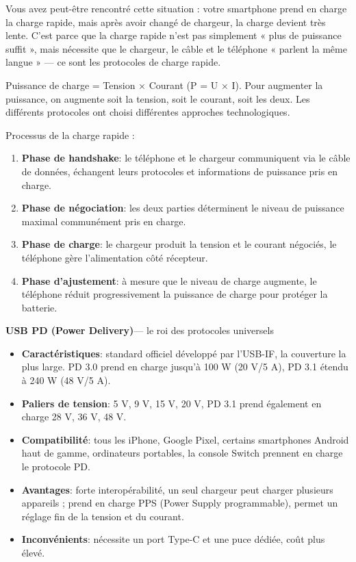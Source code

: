 
Vous avez peut-être rencontré cette situation : votre smartphone prend en charge la charge rapide, mais après avoir changé de chargeur, la charge devient très lente. C'est parce que la charge rapide n'est pas simplement « plus de puissance suffit », mais nécessite que le chargeur, le câble et le téléphone « parlent la même langue » — ce sont les protocoles de charge rapide.


Puissance de charge = Tension × Courant (P = U × I). Pour augmenter la puissance, on augmente soit la tension, soit le courant, soit les deux. Les différents protocoles ont choisi différentes approches technologiques.

Processus de la charge rapide :

\begin{enumerate}
  \item \textbf{Phase de handshake}: le téléphone et le chargeur communiquent via le câble de données, échangent leurs protocoles et informations de puissance pris en charge.
  \item \textbf{Phase de négociation}: les deux parties déterminent le niveau de puissance maximal communément pris en charge.
  \item \textbf{Phase de charge}: le chargeur produit la tension et le courant négociés, le téléphone gère l'alimentation côté récepteur.
  \item \textbf{Phase d'ajustement}: à mesure que le niveau de charge augmente, le téléphone réduit progressivement la puissance de charge pour protéger la batterie.
\end{enumerate}


\textbf{USB PD (Power Delivery)}— le roi des protocoles universels

\begin{itemize}
  \item \textbf{Caractéristiques}: standard officiel développé par l'USB-IF, la couverture la plus large. PD 3.0 prend en charge jusqu'à 100 W (20 V/5 A), PD 3.1 étendu à 240 W (48 V/5 A).
  \item \textbf{Paliers de tension}: 5 V, 9 V, 15 V, 20 V, PD 3.1 prend également en charge 28 V, 36 V, 48 V.
  \item \textbf{Compatibilité}: tous les iPhone, Google Pixel, certains smartphones Android haut de gamme, ordinateurs portables, la console Switch prennent en charge le protocole PD.
  \item \textbf{Avantages}: forte interopérabilité, un seul chargeur peut charger plusieurs appareils ; prend en charge PPS (Power Supply programmable), permet un réglage fin de la tension et du courant.
  \item \textbf{Inconvénients}: nécessite un port Type-C et une puce dédiée, coût plus élevé.
\end{itemize}

